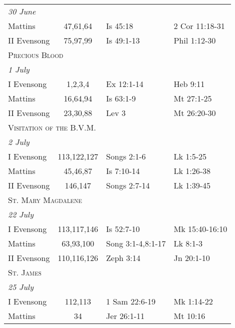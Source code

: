 \begin{longtable}{l c l l}
\multicolumn{4}{l}{\textit{30 June}}\\
\hspace{1em} Mattins&47,61,64&Is 45:18&2 Cor 11:18-31\\
\hspace{1em} II Evensong&75,97,99&Is 49:1-13&Phil 1:12-30\\
%
\multicolumn{4}{l}{\textsc{Precious Blood}}\\
\multicolumn{4}{l}{\textit{1 July}}\\
\hspace{1em} I Evensong&1,2,3,4&Ex 12:1-14&Heb 9:11\\
\hspace{1em} Mattins&16,64,94&Is 63:1-9&Mt 27:1-25\\
\hspace{1em} II Evensong&23,30,88&Lev 3&Mt 26:20-30\\
\multicolumn{4}{l}{\textsc{Visitation of the B.V.M.}}\\
\multicolumn{4}{l}{\textit{2 July}}\\
\hspace{1em} I Evensong&113,122,127&Songs 2:1-6&Lk 1:5-25\\
\hspace{1em} Mattins&45,46,87&Is 7:10-14&Lk 1:26-38\\
\hspace{1em} II Evensong&146,147&Songs 2:7-14&Lk 1:39-45\\
\multicolumn{4}{l}{\textsc{St. Mary Magdalene}}\\
\multicolumn{4}{l}{\textit{22 July}}\\
\hspace{1em} I Evensong&113,117,146&Is 52:7-10&Mk 15:40-16:10\\
\hspace{1em} Mattins&63,93,100&Song 3:1-4,8:1-17&Lk 8:1-3\\
\hspace{1em} II Evensong&110,116,126&Zeph 3:14&Jn 20:1-10\\
\multicolumn{4}{l}{\textsc{St. James}}\\
\multicolumn{4}{l}{\textit{25 July}}\\
\hspace{1em} I Evensong&112,113&1 Sam 22:6-19&Mk 1:14-22\\
\hspace{1em} Mattins&34&Jer 26:1-11&Mt 10:16\\

\end{longtable}
